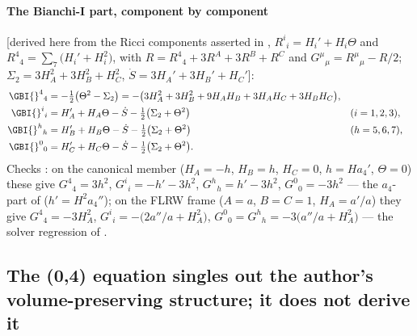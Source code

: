 \paragraph{The Bianchi-I part, component by component} [derived here from the Ricci components asserted
in , $R^i{}_i=H_i'+H_i\Theta$ and $R^4{}_4=\sum_7\bigl(H_i'+H_i^2\bigr)$, with
$R=R^4{}_4+3R^A+3R^B+R^C$ and $G^\mu{}_\mu=R^\mu{}_\mu-R/2$; $\Sigma_2=3H_A^2+3H_B^2+H_C^2$,
$\dot S=3H_A'+3H_B'+H_C'$]:
\begin{align*}
  \GBI{}^4{}_4&=-\tfrac12\bigl(\Theta^2-\Sigma_2\bigr)=-\bigl(3H_A^2+3H_B^2+9H_AH_B+3H_AH_C+3H_BH_C\bigr),\\
  \GBI{}^i{}_i&=H_A'+H_A\Theta-\dot S-\tfrac12\bigl(\Sigma_2+\Theta^2\bigr) &&(i=1,2,3),\\
  \GBI{}^h{}_h&=H_B'+H_B\Theta-\dot S-\tfrac12\bigl(\Sigma_2+\Theta^2\bigr) &&(h=5,6,7),\\
  \GBI{}^0{}_0&=H_C'+H_C\Theta-\dot S-\tfrac12\bigl(\Sigma_2+\Theta^2\bigr).
\end{align*}
Checks \cfderived: on the canonical member ($H_A=-h$, $H_B=h$, $H_C=0$, $h=Ha_4'$, $\Theta=0$) these give
$G^4{}_4=3h^2$, $G^i{}_i=-h'-3h^2$, $G^h{}_h=h'-3h^2$, $G^0{}_0=-3h^2$ --- the $a_4$-part of
 ($h'=H^2a_4''$); on the FLRW frame ($A=a$, $B=C=1$, $H_A=a'/a$) they give
$G^4{}_4=-3H_A^2$, $G^i{}_i=-\bigl(2a''/a+H_A^2\bigr)$, $G^0{}_0=G^h{}_h=-3\bigl(a''/a+H_A^2\bigr)$ --- the
solver regression of .

\subsection{The (0,4) equation singles out the author's volume-preserving structure; it does not derive it}
\label{sec:5.2}

